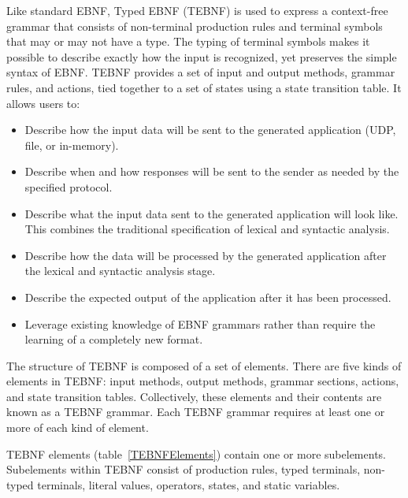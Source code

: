 \makeappendices
{}
\label{appendix:TEBNF}

\label{sec:TEBNFGrammarSyntax}
Like standard EBNF, Typed EBNF (TEBNF) is used to express a context-free grammar that consists of non-terminal production rules and terminal symbols that may or may not have a type.  The typing of terminal symbols makes it possible to describe exactly how the input is recognized, yet preserves the simple syntax of EBNF.  TEBNF provides a set of input and output methods, grammar rules, and actions, tied together to a set of states using a state transition table.  It allows users to:
\begin{itemize}
  \item Describe how the input data will be sent to the generated application (UDP, file, or in-memory).
  \item Describe when and how responses will be sent to the sender as needed by the specified protocol.
  \item Describe what the input data sent to the generated application will look like.  This combines the traditional specification of lexical and syntactic analysis.
  \item Describe how the data will be processed by the generated application after the lexical and syntactic analysis stage.
  \item Describe the expected output of the application after it has been processed.  
  \item Leverage existing knowledge of EBNF grammars rather than require the learning of a completely new format.
\end{itemize}

\label{sec:TEBNFStructure}
The structure of TEBNF is composed of a set of elements.  There are five kinds of elements in TEBNF: input methods, output methods, grammar sections, actions, and state transition tables.  Collectively, these elements and their contents are known as a TEBNF grammar.  Each TEBNF grammar requires at least one or more of each kind of element.

\label{sec:TEBNFElementsAndSubelements}
TEBNF elements (table~\ref{TEBNFElements}) contain one or more subelements.  Subelements within TEBNF consist of production rules, typed terminals, non-typed terminals, literal values, operators, states, and static variables.

